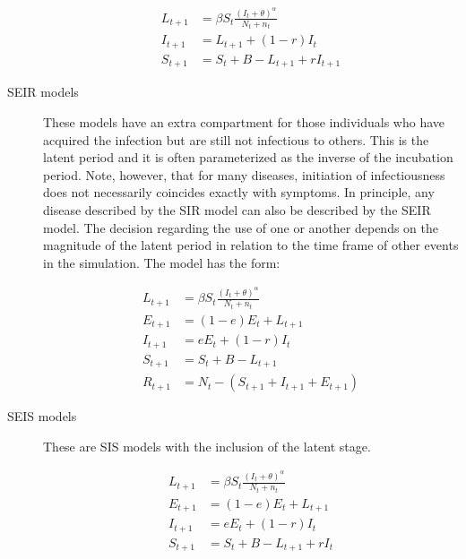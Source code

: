 \begin{description}
\begin{align} \label{E:SISmodel}
        L_{t+1} &= \beta S_t \frac{(I_t+\theta)^\alpha} {N_t+n_t} \nonumber\\
        I_{t+1} &= L_{t+1} + (1-r)I_t\nonumber\\
        S_{t+1} &= S_t + B - L_{t+1} + r I_{t+1}
\end{align}


\item[SEIR models]
These models have an extra compartment for those individuals who have acquired the infection but are still not infectious to others. This is the latent period and it is often parameterized as the inverse of the incubation period. Note, however, that for many diseases, initiation of infectiousness does not necessarily coincides exactly with symptoms. In principle, any disease described by the SIR model can also be described by the SEIR model. The decision regarding the use of one or another depends on the magnitude of the latent period in relation to the time frame of other events in the simulation. The model has the form:

\begin{align} \label{E:SEIRmodel}
        L_{t+1} &= \beta S_t \frac{(I_t+\theta)^\alpha} {N_t+n_t}\nonumber \\
	E_{t+1} &= (1-e) E_t + L_{t+1}\nonumber\\
        I_{t+1} &= e E_t + (1-r)I_t\nonumber\\
        S_{t+1} &= S_t + B - L_{t+1}\nonumber\\
        R_{t+1} &= N_t-(S_{t+1}+I_{t+1}+E_{t+1})
\end{align}


 
\item[SEIS models]

These are SIS models with the inclusion of the latent stage. 

\begin{align} \label{E:SEISmodel}
        L_{t+1} &= \beta S_t \frac{(I_t+\theta)^\alpha} {N_t+n_t}\nonumber \\
	E_{t+1} &= (1-e) E_t + L_{t+1}\nonumber\\
        I_{t+1} &= e E_t + (1-r)I_t\nonumber\\
        S_{t+1} &= S_t + B - L_{t+1} + r I_t
\end{align}

\end{description}

